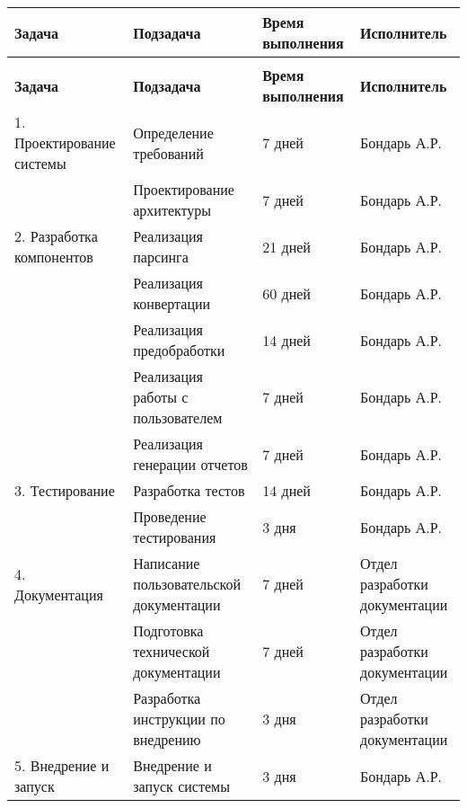 \begin{longtable}{|p{3.5cm}|p{4cm}|p{3cm}|p{4cm}|}
	\caption{} \label{table:stages} \\
	\hline
	\textbf{Задача}
	& \textbf{Подзадача}
	& \textbf{Время выполнения}
	& \textbf{Исполнитель} \\
	\hline
	\endfirsthead
	\conttable{table:stages} \\
	\hline
	\textbf{Задача}
	& \textbf{Подзадача}
	& \textbf{Время выполнения}
	& \textbf{Исполнитель} \\
	\hline
	\endhead
	1. Проектирование системы
	& Определение требований
	& 7 дней
	& Бондарь А.Р. \\ \hline

	& Проектирование архитектуры
	& 7 дней
	& Бондарь А.Р. \\ \hline

	2. Разработка компонентов
	& Реализация парсинга
	& 21 дней
	& Бондарь А.Р. \\ \hline

	& Реализация конвертации
	& 60 дней
	& Бондарь А.Р. \\ \hline

	& Реализация предобработки
	& 14 дней
	& Бондарь А.Р. \\ \hline

	& Реализация работы с пользователем
	& 7 дней
	& Бондарь А.Р. \\ \hline

	& Реализация генерации отчетов
	& 7 дней
	& Бондарь А.Р. \\ \hline

	3. Тестирование
	& Разработка тестов
	& 14 дней
	& Бондарь А.Р. \\ \hline

	& Проведение тестирования
	& 3 дня
	& Бондарь А.Р. \\ \hline

	4. Документация
	& Написание пользовательской документации
	& 7 дней
	& Отдел разработки документации \\ \hline

	& Подготовка технической документации
	& 7 дней
	& Отдел разработки документации \\ \hline

	& Разработка инструкции по внедрению
	& 3 дня
	& Отдел разработки документации \\ \hline

	5. Внедрение и запуск
	& Внедрение и запуск системы
	& 3 дня
	& Бондарь А.Р. \\ \hline
\end{longtable}


